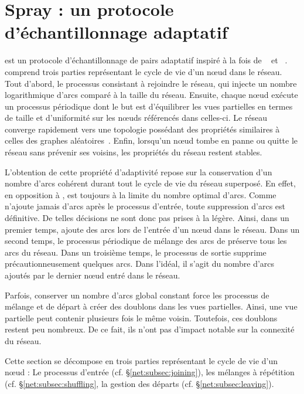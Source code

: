 
\section{Spray : un protocole d'échantillonnage adaptatif}
\label{net:sec:spray}

\SPRAY est un protocole d'échantillonnage de pairs adaptatif inspiré à la fois
de \SCAMP~\cite{ganesh2003peer} et \CYCLON~\cite{voulgaris2005cyclon}. \SPRAY
comprend trois parties représentant le cycle de vie d'un nœud dans le
réseau. Tout d'abord, le processus consistant à rejoindre le réseau, qui injecte
un nombre logarithmique d'arcs comparé à la taille du réseau.  Ensuite, chaque
nœud exécute un processus périodique dont le but est d'équilibrer les vues
partielles en termes de taille et d'uniformité sur les nœuds référencés dans
celles-ci. Le réseau converge rapidement vers une topologie possédant des
propriétés similaires à celles des graphes
aléatoires~\cite{erdos1959random}. Enfin, lorsqu'un nœud tombe en panne ou
quitte le réseau sans prévenir ses voisins, les propriétés du réseau restent
stables.

L'obtention de cette propriété d'adaptivité repose sur la conservation d'un
nombre d'arcs cohérent durant tout le cycle de vie du réseau superposé.  En
effet, en opposition à \CYCLON, \SPRAY est toujours à la limite du nombre
optimal d'arcs. Comme \SPRAY n'ajoute jamais d'arcs après le processus d'entrée,
toute suppression d'arcs est définitive. De telles décisions ne sont donc pas
prises à la légère. Ainsi, dans un premier temps, \SPRAY ajoute des arcs lors de
l'entrée d'un nœud dans le réseau. Dans un second temps, le processus périodique
de mélange des arcs de \SPRAY préserve tous les arcs du réseau.  Dans un
troisième temps, le processus de sortie supprime précautionneusement quelques
arcs. Dans l'idéal, il s'agit du nombre d'arcs ajoutés par le dernier nœud entré
dans le réseau.

Parfois, conserver un nombre d'arcs global constant force les processus de
mélange et de départ à créer des doublons dans les vues partielles. Ainsi, une
vue partielle peut contenir plusieurs fois le même voisin. Toutefois, ces
doublons restent peu nombreux. De ce fait, ils n'ont pas d'impact notable sur la
connexité du réseau.

Cette section se décompose en trois parties représentant le cycle de vie d'un
nœud : Le processus d'entrée (cf. §\ref{net:subsec:joining}), les mélanges à
répétition (cf. §\ref{net:subsec:shuffling}, la gestion des départs
(cf. §\ref{net:subsec:leaving}).

